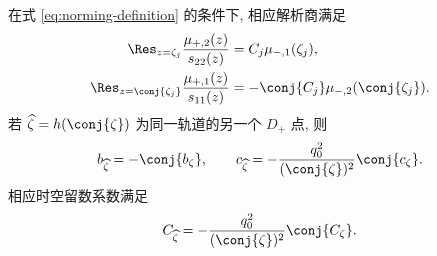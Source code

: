 \begin{proposition}[简单零点的留数及常数约化]\label{prop:respair}
在式 \eqref{eq:norming-definition} 的条件下, 相应解析商满足
\begin{align}
\Res_{z=\zeta_j}\dfrac{\mu_{+,2}(z)}{s_{22}(z)}
&=C_j\mu_{-,1}(\zeta_j),\label{eq:resplus}\\
\Res_{z=\conj{\zeta_j}}\dfrac{\mu_{+,1}(z)}{s_{11}(z)}
&=-\conj{C_j}\mu_{-,2}(\conj{\zeta_j}).\label{eq:resminus}
\end{align}
若 $\widehat\zeta=h(\conj{\zeta})$ 为同一轨道的另一个 $D_+$ 点, 则
\begin{equation}\label{eq:cpair}
b_{\widehat\zeta}=-\conj{b_\zeta},\qquad
c_{\widehat\zeta}=-\dfrac{q_0^2}{(\conj{\zeta})^2}\conj{c_\zeta}.
\end{equation}
相应时空留数系数满足
\begin{equation}\label{eq:Cpair}
C_{\widehat\zeta}=-\dfrac{q_0^2}{(\conj{\zeta})^2}\conj{C_\zeta}.
\end{equation}
\end{proposition}

